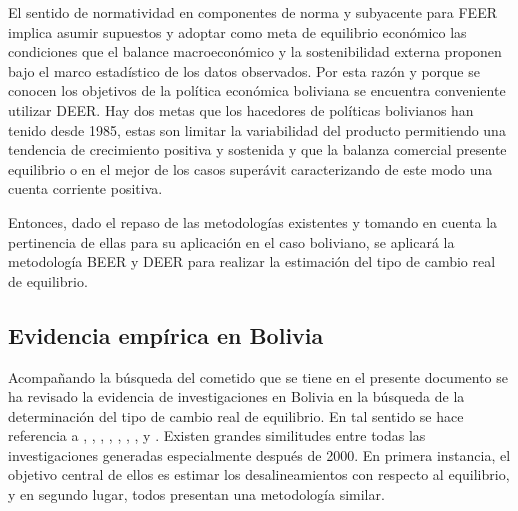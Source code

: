 \documentclass[12pt,letterpaper]{article}
\begin{document}
El sentido de normatividad en componentes de norma y subyacente para FEER implica asumir supuestos y adoptar como meta de equilibrio económico las condiciones que el balance macroeconómico y la sostenibilidad externa proponen bajo el marco estadístico de los datos observados. Por esta razón y porque se conocen los objetivos de la política económica boliviana se encuentra conveniente utilizar DEER. Hay dos metas que los hacedores de políticas bolivianos han tenido desde 1985, estas son limitar la variabilidad del producto permitiendo una tendencia de crecimiento positiva y sostenida y que la balanza comercial presente equilibrio o en el mejor de los casos superávit caracterizando de este modo una cuenta corriente positiva.

Entonces, dado el repaso de las metodologías existentes y tomando en cuenta la pertinencia de ellas para su aplicación en el caso boliviano, se aplicará la metodología BEER y DEER para realizar la estimación del tipo de cambio real de equilibrio. 



\subsection*{Evidencia empírica en Bolivia}
Acompañando la búsqueda del cometido que se tiene en el presente documento se ha revisado la evidencia de investigaciones en Bolivia en la búsqueda de la determinación del tipo de cambio real de equilibrio. En tal sentido se hace referencia a \cite{ferrufino1992tipo}, \cite{marquez2003estimacion}, \cite{humerez2005reexaminando}, \cite{montiel2007equilibrium}, \cite{cerutti2008bolivia}, \cite{mendieta2008equilibrio}, \cite{bello2010tipo}, \cite{cerezo2010desempeno} y \cite{cerezo2011tipo}. Existen grandes similitudes entre todas las investigaciones generadas especialmente después de 2000. En primera instancia, el objetivo central de ellos es estimar los desalineamientos con respecto al equilibrio, y en segundo lugar, todos presentan una metodología similar.
\end{document}
